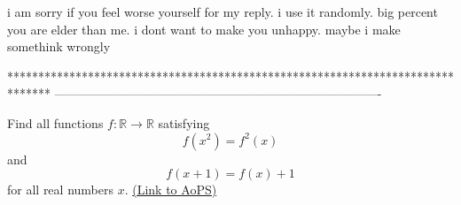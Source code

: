 \begin{solution}
	i am sorry if you feel worse yourself for my reply. i use it randomly.  big percent you are elder than me. i dont want to make you unhappy.  maybe i make somethink wrongly
\end{solution}
*******************************************************************************
-------------------------------------------------------------------------------

\begin{problem}
	Find all functions $f: \mathbb R \to \mathbb R$ satisfying
\[ f(x^2) = f^2(x)\] and \[ f(x + 1) = f(x) + 1\] for all real numbers $x$.
	\flushright \href{https://artofproblemsolving.com/community/c6h306697}{(Link to AoPS)}
\end{problem}



